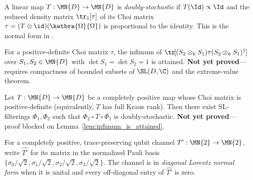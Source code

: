 \begin{definition}\label{def:doubly_stochastic}
    A linear map $T : \MN{D} \to \MN{D}$ is \emph{doubly-stochastic}
    if $T(\Id) \propto \Id$ and the reduced density matrix
    $\tr_{1}[\tau]$ of its Choi matrix $\tau = (T \otimes \id)(\ketbra{\Omega}{\Omega})$
    is proportional to the identity. This is the normal form in
    \cite[Proposition~2.8]{Wolf2012Quantum}.
\end{definition}

\begin{lemma}\label{lem:infimum_is_attained}
    For a positive-definite Choi matrix $\tau$, the infimum of
    $\tr\![(S_{2} \otimes_{k} S_{1}) \tau (S_{2} \otimes_{k} S_{1})^{\dagger}]$
    over $S_{1}, S_{2} \in \MN{D}$ with $\det S_{1} = \det S_{2} = 1$
    is attained. \textbf{Not yet proved}---requires compactness of bounded
    subsets of $\SL(D, \C)$ and the extreme-value theorem.
\end{lemma}

\begin{theorem}\label{thm:exists_normal_form_generic}
    Let $T : \MN{D} \to \MN{D}$ be a completely positive map whose Choi matrix
    is positive-definite (equivalently, $T$ has full Kraus rank). Then there
    exist SL-filterings $\Phi_{1}, \Phi_{2}$ such that
    $\Phi_{2} \circ T \circ \Phi_{1}$ is doubly-stochastic.
    \textbf{Not yet proved}---proof blocked on Lemma~\ref{lem:infimum_is_attained}.
\end{theorem}

\begin{definition}\label{def:lorentz_diagonal}
    For a completely positive, trace-preserving qubit channel
    $T' : \MN{2} \to \MN{2}$, write $\widehat{T'}$ for its matrix
    in the normalized Pauli basis
    $\{\sigma_{0}/\sqrt{2},\sigma_{1}/\sqrt{2},
        \sigma_{2}/\sqrt{2},\sigma_{3}/\sqrt{2}\}$. The channel is in
    \emph{diagonal Lorentz normal form} when it is unital and every
    off-diagonal entry of $\widehat{T'}$ is zero.
\end{definition}

